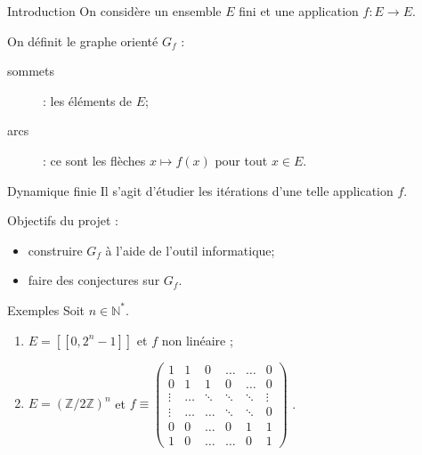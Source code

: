%
\begin{frame}{Introduction}
On consid\`ere un ensemble $E$ fini et une application $f:E\rightarrow E$.

On d\'efinit le graphe orient\'e $G_f$ :
\begin{description}
\item[sommets] : les \'el\'ements de $E$;
\item[arcs] : ce sont les fl\`eches $x\mapsto f(x)$ pour tout $x\in E$.
\end{description}
\end{frame}

\begin{frame}{Dynamique finie}
Il s'agit d'\'etudier les it\'erations d'une telle application $f$.

Objectifs du projet :
\begin{itemize}
\item construire $G_f$ \`a l'aide de l'outil informatique;
\item faire des conjectures sur $G_f$.
\end{itemize}
\end{frame}

\begin{frame}{Exemples}
Soit $n\in \mathbb{N}^*$.
\begin{enumerate}
\item $E=[\![0, 2^{n}-1]\!]$ et $f$ non lin\'eaire ;
\item $E=(\mathbb{Z}/2\mathbb{Z})^n$ et $f\equiv \begin{pmatrix}
1 & 1 & 0 & \dots & \dots & 0\\
0 & 1 & 1 & 0 & \dots & 0\\
\vdots & \dots & \ddots & \ddots & \ddots & \vdots\\
\vdots & \dots & \dots & \ddots & \ddots & 0\\
0 & 0 & \dots & 0 & 1 & 1\\
1 & 0 & \dots & \dots & 0 & 1
\end{pmatrix}$ .
\end{enumerate}
\end{frame}
